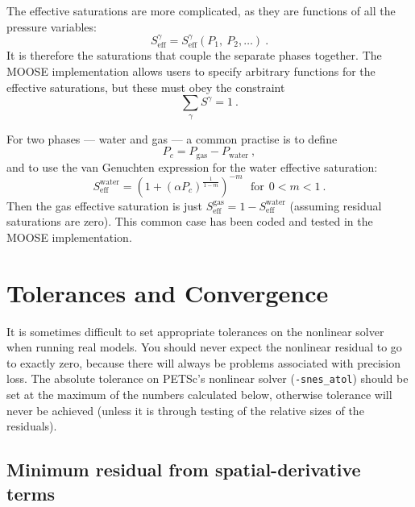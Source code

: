 \documentclass[]{scrreprt}
\begin{document}
The effective saturations are more complicated, as they are functions
of all the pressure variables:
\begin{equation}
S^{\gamma}_{\mathrm{eff}} =
S^{\gamma}_{\mathrm{eff}}(P_{1},\ P_{2},\ldots) \ .
\end{equation}
It is therefore the saturations that couple the separate phases
together.  The MOOSE implementation allows users to specify arbitrary
functions for the effective saturations, but these must obey the
constraint 
\begin{equation}
\sum_{\gamma}S^{\gamma} = 1 \ .
\end{equation}

For two phases --- water and gas --- a common practise is to define
\begin{equation}
P_{c} = P_{\mathrm{gas}} - P_{\mathrm{water}} \ ,
\end{equation}
and to use the van Genuchten expression for the
water effective saturation:
\begin{equation}
S^{\mathrm{water}}_{\mathrm{eff}} = \left( 1 + (\alpha P_{c})^{\frac{1}{1 - m}}
\right)^{-m} \ \ \ \mbox{for}\ \ 0<m<1 \ .
\end{equation}
Then the gas effective saturation is just
$S^{\mathrm{gas}}_{\mathrm{eff}} = 1 -
S^{\mathrm{water}}_{\mathrm{eff}}$ (assuming residual saturations are
zero).  This common case has been coded and tested in the MOOSE implementation.





\chapter{Tolerances and Convergence}
\label{tol.chap}

It is sometimes difficult to set appropriate tolerances on the
nonlinear solver when running real models.  You should never expect
the nonlinear residual to go to exactly zero, because there will
always be problems associated with precision loss.  The absolute
tolerance on PETSc's nonlinear solver ({\tt{-snes\_atol}}) should be
set at the maximum of the numbers calculated below, otherwise
tolerance will never be achieved (unless it is through testing of the
relative sizes of the residuals).

\section{Minimum residual from spatial-derivative terms}
\label{sec.min.res.spat}
\end{document}
